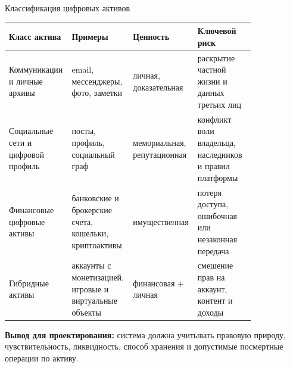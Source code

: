 \documentclass{beamer}
\begin{document}
\begin{frame}{Классификация цифровых активов}
  \tiny
  \renewcommand{\arraystretch}{0.95}
  \begin{table}
    \centering
    \begin{tabular}{L{0.19\linewidth} L{0.22\linewidth} L{0.18\linewidth} L{0.23\linewidth}}
      \toprule
      \textbf{Класс актива} & \textbf{Примеры} & \textbf{Ценность} & \textbf{Ключевой риск} \\
      \midrule
      Коммуникации и личные архивы & email, мессенджеры, фото, заметки & личная, доказательная & раскрытие частной жизни и данных третьих лиц \\
      Социальные сети и цифровой профиль & посты, профиль, социальный граф & мемориальная, репутационная & конфликт воли владельца, наследников и правил платформы \\
      Финансовые цифровые активы & банковские и брокерские счета, кошельки, криптоактивы & имущественная & потеря доступа, ошибочная или незаконная передача \\
      Гибридные активы & аккаунты с монетизацией, игровые и виртуальные объекты & финансовая + личная & смешение прав на аккаунт, контент и доходы \\
      \bottomrule
    \end{tabular}
  \end{table}

  \vspace{-0.05cm}
  \textbf{Вывод для проектирования:} система должна учитывать правовую природу, чувствительность, ликвидность, способ хранения и допустимые посмертные операции по активу.
\end{frame}
\end{document}

